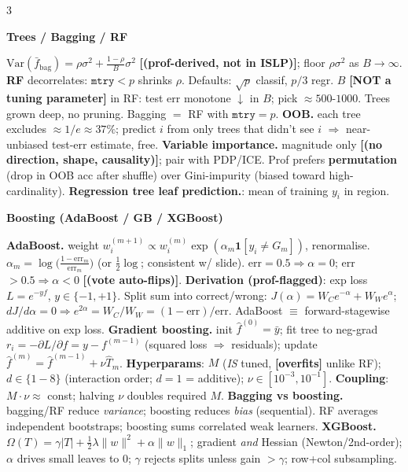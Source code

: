 \documentclass[a4paper,8pt]{extarticle}
\renewcommand{\section}[1]{\par\vspace{2pt}\noindent\colorbox{black!15}{\parbox{0.97\linewidth}{\strut\bfseries\small #1}}\par\vspace{1pt}}
\newcommand{\hd}[1]{\textbf{#1.}}
\newcommand{\tr}[1]{\textcolor{red!70!black}{\textbf{[#1]}}} %
\newcommand{\Var}{\mathrm{Var}}
\begin{document}
\begin{multicols*}{3}
\section{Trees / Bagging / RF}
$\Var(\bar f_{\text{bag}})=\rho\sigma^2+\tfrac{1-\rho}{B}\sigma^2$ \tr{(prof-derived, not in ISLP)}; floor $\rho\sigma^2$ as $B\to\infty$.
\textbf{RF} decorrelates: $\mathtt{mtry}<p$ shrinks $\rho$. Defaults: $\sqrt p$ classif, $p/3$ regr.
$B$ \tr{NOT a tuning parameter} in RF: test err monotone $\downarrow$ in $B$; pick $\approx 500$-$1000$. Trees grown deep, no pruning. Bagging $=$ RF with $\mathtt{mtry}=p$.
\hd{OOB} each tree excludes $\approx 1/e\approx 37\%$; predict $i$ from only trees that didn't see $i$ $\Rightarrow$ near-unbiased test-err estimate, free.
\hd{Variable importance} magnitude only \tr{(no direction, shape, causality)}; pair with PDP/ICE. Prof prefers \textbf{permutation} (drop in OOB acc after shuffle) over Gini-impurity (biased toward high-cardinality).
\hd{Regression tree leaf prediction}: mean of training $y_i$ in region.

\section{Boosting (AdaBoost / GB / XGBoost)}
\hd{AdaBoost} weight $w_i^{(m+1)}\propto w_i^{(m)}\exp(\alpha_m\mathbf{1}[y_i\ne G_m])$, renormalise.
$\alpha_m=\log\!\bigl(\tfrac{1-\text{err}_m}{\text{err}_m}\bigr)$ (or $\tfrac12\log$; consistent w/ slide). err$=0.5\Rightarrow\alpha=0$; err$>0.5\Rightarrow\alpha<0$ \tr{(vote auto-flips)}.
\textbf{Derivation (prof-flagged)}: exp loss $L=e^{-yf}$, $y\in\{-1,+1\}$. Split sum into correct/wrong: $J(\alpha)=W_C e^{-\alpha}+W_W e^{\alpha}$; $dJ/d\alpha=0\Rightarrow e^{2\alpha}=W_C/W_W=(1-\text{err})/\text{err}$. AdaBoost $\equiv$ forward-stagewise additive on exp loss.
\hd{Gradient boosting} init $\hat f^{(0)}=\bar y$; fit tree to neg-grad $r_i=-\partial L/\partial f=y-f^{(m-1)}$ (squared loss $\Rightarrow$ residuals); update $\hat f^{(m)}=\hat f^{(m-1)}+\nu\hat T_m$.
\textbf{Hyperparams}: $M$ (\emph{IS} tuned, \tr{overfits} unlike RF); $d\in\{1\!-\!8\}$ (interaction order; $d=1$ = additive); $\nu\in[10^{-3},10^{-1}]$. \textbf{Coupling}: $M\cdot\nu\approx$ const; halving $\nu$ doubles required $M$.
\hd{Bagging vs boosting} bagging/RF reduce \emph{variance}; boosting reduces \emph{bias} (sequential). RF averages independent bootstraps; boosting sums correlated weak learners.
\hd{XGBoost} $\Omega(T)=\gamma|T|+\tfrac12\lambda\|w\|^2+\alpha\|w\|_1$; gradient \emph{and} Hessian (Newton/2nd-order); $\alpha$ drives small leaves to 0; $\gamma$ rejects splits unless gain $>\gamma$; row+col subsampling.


\end{multicols*}
\end{document}
